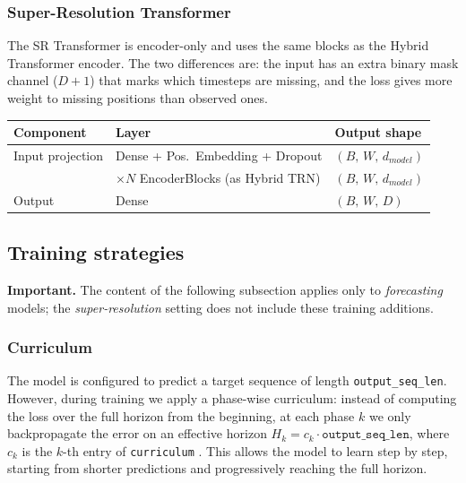 \subsubsection{Super-Resolution Transformer}

The SR Transformer is encoder-only and uses the same blocks as the Hybrid Transformer encoder. The two differences are: the input has an extra binary mask channel ($D{+}1$) that marks which timesteps are missing, and the loss gives more weight to missing positions than observed ones.

\vspace{2em}

\begin{table}[h]
\centering
\begin{tabular}{lll}
\hline
\textbf{Component} & \textbf{Layer} & \textbf{Output shape} \\
\hline
Input projection  & Dense + Pos.\ Embedding + Dropout & $(B,\,W,\,d_{model})$ \\
                  & $\times N$\; EncoderBlocks (as Hybrid TRN) & $(B,\,W,\,d_{model})$ \\
Output            & Dense & $(B,\,W,\,D)$ \\
\hline
\end{tabular}
\end{table}

\subsection{Training strategies}


\noindent\textbf{Important.} The content of the following subsection applies only to \emph{forecasting} models; the \emph{super-resolution} setting does not include these training additions.




\subsubsection{Curriculum}
\label{sec:curriculum}

The model is configured to predict a target sequence of length \texttt{output\_seq\_len}. However, during training we apply a phase-wise curriculum: instead of computing the loss over the full horizon from the beginning, at each phase $k$ we only backpropagate the error on an effective horizon
$H_k = c_k \cdot \texttt{output\_seq\_len}$,
where $c_k$ is the $k$-th entry of \texttt{curriculum} \cite{bengio2009curriculum}. This allows the model to learn step by step, starting from shorter predictions and progressively reaching the full horizon.

